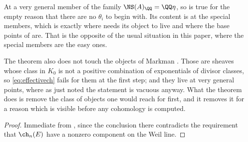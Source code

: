 \begin{remark}\label{rem:markmanpositivity}
At a very general member of the family $\NS(A)_{\QQ}=\QQ\eta$, so
 is true for the empty reason that there are no
$\theta_{i}$ to begin with. Its content is at the special members, which is
exactly where  needs its object to live and where the
base points of  are. That is the opposite of the usual
situation in this paper, where the special members are the easy ones.

The theorem also does not touch the objects of Markman \cite{Mar25a,Mar25b}.
Those are sheaves whose class in $K_{0}$ is not a positive combination of
exponentials of divisor classes, so \eqref{eq:effectivech} fails for them at
the first step; and they live at very general points, where as just noted the
statement is vacuous anyway. What the theorem does is remove the class of
objects one would reach for first, and it removes it for a reason which is
visible before any cohomology is computed.
\end{remark}

\begin{proof}
Immediate from , since the conclusion there contradicts
the requirement that $\ch_{n}(E)$ have a nonzero component on the Weil line.
\end{proof}


